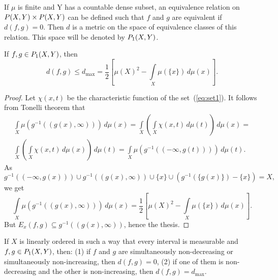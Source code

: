 If $\mu$ is finite and Y has a countable dense subset, an equivalence
relation on $P(X, Y) \times P(X, Y)$ can be defined
such that $f$ and $g$ are equivalent if $d(f, g) = 0$. Then $d$ is a
metric on the space of equivalence classes of this relation. This
space will be denoted by $P_1(X, Y)$.

\begin{prop}
If $f, g \in P_1(X, Y)$, then \[ d(f, g) \leq d_{\max} =
\frac{1}{2} \left[ \mu(X)^2 - \int \limits_X \mu(\{x\}) \, d\mu(x)
  \right]. \]
\end{prop}

\begin{proof}
Let $\chi(x, t)$ be the characteristic function of the
set~(\ref{eq:set1}). It follows from Tonelli theorem that
\[ \begin{split}
  \int \limits_X \mu(g^{-1}((g(x), \infty))) \, d\mu(x) =
  \int \limits_X \left( \int \limits_X \chi(x, t) \, d\mu(t) \right)
  \, d\mu(x) = \\
  \int \limits_X \left( \int \limits_X \chi(x, t) \, d\mu(x) \right)
  \, d\mu(t) =
  \int \limits_X \mu(g^{-1}((-\infty, g(t)))) \, d\mu(t).
\end{split} \]
As \[ g^{-1}((-\infty, g(x))) \cup g^{-1}((g(x), \infty)) \cup \{ x \}
\cup \left( g^{-1}(\{ g(x) \}) - \{ x \} \right) = X,\] we get \[ \int
\limits_X \mu(g^{-1}((g(x), \infty))) \, d\mu(x) = \frac{1}{2} \left[
  \mu(X)^2 - \int \limits_X \mu(\{x\}) \, d\mu(x) \right]. \] But
$E_x(f, g) \subseteq g^{-1}((g(x), \infty))$, hence the thesis.
\end{proof}

\begin{prop}
If $X$ is linearly ordered in such a way that every interval is
measurable and $f, g \in P_1(X, Y)$, then: (1) if $f$ and $g$
are simultaneously non-decreasing or simultaneously non-increasing,
then $d(f, g) = 0$, (2) if one of them is non-decreasing and the other
is non-increasing, then $d(f, g) = d_{\max}$.
\end{prop}

